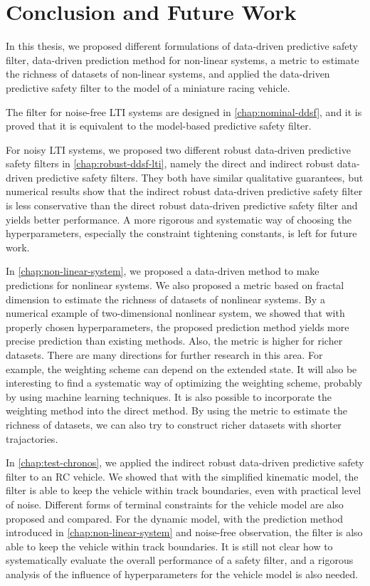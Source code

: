 \chapter{Conclusion and Future Work}\label{chap:conclusion}

In this thesis, we proposed different formulations of data-driven predictive safety filter, data-driven prediction method for non-linear systems, a metric to estimate the richness of datasets of non-linear systems, and applied the data-driven predictive safety filter to the model of a miniature racing vehicle.

The filter for noise-free LTI systems are designed in \cref{chap:nominal-ddsf}, and it is proved that it is equivalent to the model-based predictive safety filter.

For noisy LTI systems, we proposed two different robust data-driven predictive safety filters in \cref{chap:robust-ddsf-lti}, namely the direct and indirect robust data-driven predictive safety filters.
They both have similar qualitative guarantees, but numerical results show that the indirect robust data-driven predictive safety filter is less conservative than the direct robust data-driven predictive safety filter and yields better performance.
A more rigorous and systematic way of choosing the hyperparameters, especially the constraint tightening constants, is left for future work.

In \cref{chap:non-linear-system}, we proposed a data-driven method to make predictions for nonlinear systems.
We also proposed a metric based on fractal dimension to estimate the richness of datasets of nonlinear systems.
By a numerical example of two-dimensional nonlinear system, we showed that with properly chosen hyperparameters, the proposed prediction method yields more precise prediction than existing methods.
Also, the metric is higher for richer datasets.
There are many directions for further research in this area.
For example, the weighting scheme can depend on the extended state.
It will also be interesting to find a systematic way of optimizing the weighting scheme, probably by using machine learning techniques.
It is also possible to incorporate the weighting method into the direct method.
By using the metric to estimate the richness of datasets, we can also try to construct richer datasets with shorter trajactories.

In \cref{chap:test-chronos}, we applied the indirect robust data-driven predictive safety filter to an RC vehicle.
We showed that with the simplified kinematic model, the filter is able to keep the vehicle within track boundaries, even with practical level of noise.
Different forms of terminal constraints for the vehicle model are also proposed and compared.
For the dynamic model, with the prediction method introduced in \cref{chap:non-linear-system} and noise-free observation, the filter is also able to keep the vehicle within track boundaries.
It is still not clear how to systematically evaluate the overall performance of a safety filter, and a rigorous analysis of the influence of hyperparameters for the vehicle model is also needed.
